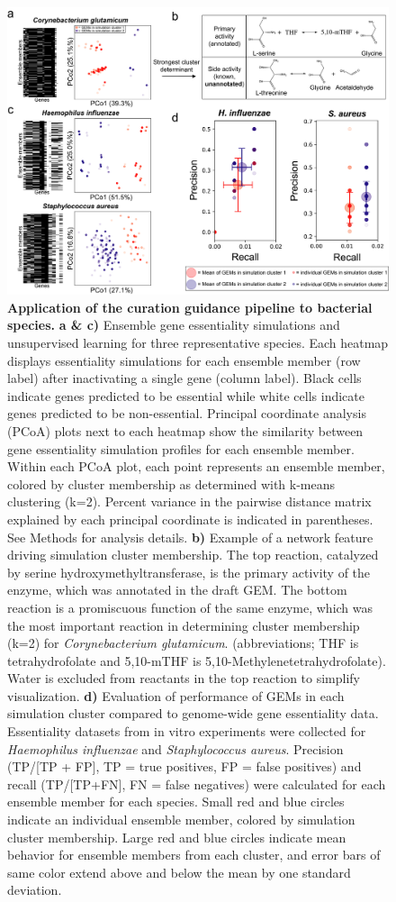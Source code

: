 \documentclass[11pt,twocolumn,notitlepage,openany,twoside]{book}
\begin{document}
\begin{refsection}
\begin{figure}
\centering
\includegraphics[width=\textwidth]{ch3_fig3}
\caption[ Application of the curation guidance pipeline to bacterial species.]{\textbf{ Application of the curation guidance pipeline to bacterial species.}  \textbf{a \& c)} Ensemble gene essentiality simulations and unsupervised learning for three representative species. Each heatmap displays essentiality simulations for each ensemble member (row label) after inactivating a single gene (column label). Black cells indicate genes predicted to be essential while white cells indicate genes predicted to be non-essential. Principal coordinate analysis (PCoA) plots next to each heatmap show the similarity between gene essentiality simulation profiles for each ensemble member. Within each PCoA plot, each point represents an ensemble member, colored by cluster membership as determined with k-means clustering (k=2). Percent variance in the pairwise distance matrix explained by each principal coordinate is indicated in parentheses. See Methods for analysis details. \textbf{b)} Example of a network feature driving simulation cluster membership. The top reaction, catalyzed by serine hydroxymethyltransferase, is the primary activity of the enzyme, which was annotated in the draft GEM. The bottom reaction is a promiscuous function of the same enzyme, which was the most important reaction in determining cluster membership (k=2) for \textit{Corynebacterium glutamicum}. (abbreviations; THF is tetrahydrofolate and 5,10-mTHF is 5,10-Methylenetetrahydrofolate). Water is excluded from reactants in the top reaction to simplify visualization. \textbf{d)} Evaluation of performance of GEMs in each simulation cluster compared to genome-wide gene essentiality data. Essentiality datasets from in vitro experiments were collected for \textit{Haemophilus influenzae} and \textit{Staphylococcus aureus}. Precision (TP/[TP + FP], TP = true positives, FP = false positives) and recall (TP/[TP+FN], FN = false negatives) were calculated for each ensemble member for each species. Small red and blue circles indicate an individual ensemble member, colored by simulation cluster membership. Large red and blue circles indicate mean behavior for ensemble members from each cluster, and error bars of same color extend above and below the mean by one standard deviation.}

\end{figure}
\end{refsection}
\end{document}
